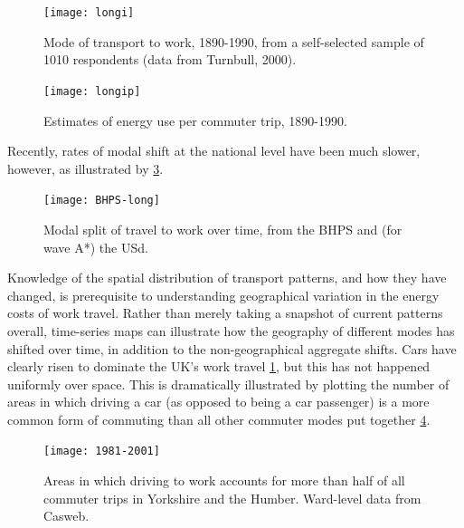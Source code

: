 \begin{figure}
 \centerline{\texttt{[image: longi]}}
 \caption[Mode of transport to work, 1890-1990]{Mode of
 transport to work, 1890-1990, from a self-selected sample of
1010 respondents (data from Turnbull, 2000).} \label{fturnmode}
\end{figure}

\begin{figure}
 \centerline{\texttt{[image: longip]}}
 \caption[Estimates of energy use per commuter trip, 1890-1990]
 {Estimates of energy use per commuter trip, 1890-1990.}
\label{flongip}
\end{figure}

Recently, rates of modal shift at the national level
have been much slower, however, as illustrated by \cref{fbhps}.
\begin{figure}[htbp]
    \texttt{[image: BHPS-long]}
  \caption[Modal split of travel to work over two decades]
  {Modal split of travel to work over time, from the BHPS and
  (for wave A*) the USd.} %
  \label{fbhps}
\end{figure} %
Knowledge of the spatial distribution of transport patterns, and how they have
changed, is prerequisite to understanding geographical variation in the energy
costs of work travel. Rather than merely taking a snapshot of current patterns
overall, time-series maps can illustrate how the geography of
different modes has shifted over time, in addition to the non-geographical
aggregate shifts.
Cars have clearly risen to dominate the
UK's work travel \cref{fturnmode}, but this has not happened uniformly over
space. This is dramatically illustrated by plotting the number of areas in which
driving a car (as opposed to being a car passenger) is a more common form of
commuting than all other commuter modes put together \cref{f1981}.

\begin{figure}[htbp]
  \centerline{
    \texttt{[image: 1981-2001]}}
  \caption[The growing dominance of the car, 1981 to 2001]
  {Areas in which driving to work accounts for more than half of all
  commuter trips in Yorkshire and the Humber. Ward-level data from
  Casweb.} %
  \label{f1981}
\end{figure}

